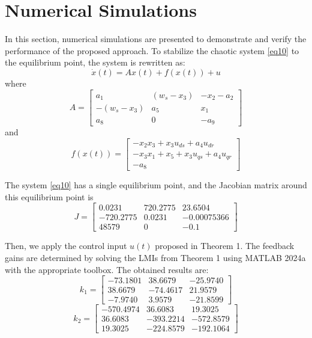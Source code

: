 \documentclass[conference]{IEEEtran}
\begin{document}
\section{Numerical Simulations}

In this section, numerical simulations are presented to demonstrate and verify the performance of the proposed approach. To stabilize the chaotic system \eqref{eq10} to the equilibrium point, the system is rewritten as:
\begin{equation}
\dot{x}(t) = Ax(t) + f(x(t)) + u
\label{eq23}
\end{equation}
where
\begin{equation*}
A = \begin{bmatrix}
a_{1} & \left( w_{s} - x_{3} \right) & - x_{2} - a_{2} \\
- \left( w_{s} - x_{3} \right) & a_{5} & x_{1} \\
a_{8} & 0 & - a_{9}
\end{bmatrix}
\end{equation*}
and
\begin{equation*}
f(x(t)) = \begin{bmatrix}
- x_{2}x_{3} + x_{3}u_{ds} + a_{4}u_{dr} \\
- x_{3}x_{1} + x_{5} + x_{3}u_{qs} + a_{4}u_{qr} \\
- a_{8}
\end{bmatrix}
\end{equation*}

The system \eqref{eq10} has a single equilibrium point, and the Jacobian matrix around this equilibrium point is
\begin{equation*}
J = \begin{bmatrix}
0.0231 & 720.2775 & 23.6504 \\
-720.2775 & 0.0231 & -0.00075366 \\
48579 & 0 & -0.1
\end{bmatrix}
\end{equation*}

Then, we apply the control input $u(t)$ proposed in Theorem 1. The feedback gains are determined by solving the LMIs from Theorem 1 using MATLAB 2024a with the appropriate toolbox. The obtained results are:
\begin{equation*}
k_{1} = \begin{bmatrix}
-73.1801 & 38.6679 & -25.9740 \\
38.6679 & -74.4617 & 21.9579 \\
-7.9740 & 3.9579 & -21.8599
\end{bmatrix}
\end{equation*}
\begin{equation*}
k_{2} = \begin{bmatrix}
-570.4974 & 36.6083 & 19.3025 \\
36.6083 & -393.2214 & -572.8579 \\
19.3025 & -224.8579 & -192.1064
\end{bmatrix}
\end{equation*}
\end{document}

